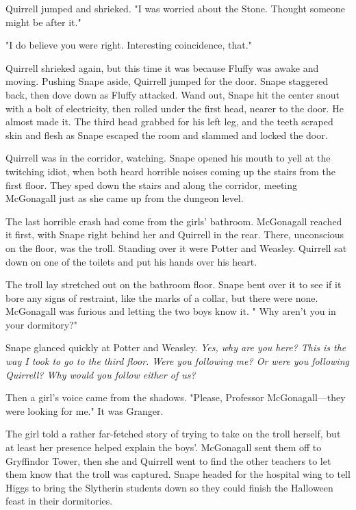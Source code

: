 Quirrell jumped and shrieked. "I{\el} was{\el} worried about the{\el} Stone. Thought{\el} someone might be{\el} after it."

"I do believe you were right. Interesting coincidence, that."

Quirrell shrieked again, but this time it was because Fluffy was awake and moving. Pushing Snape aside, Quirrell jumped for the door. Snape staggered back, then dove down as Fluffy attacked. Wand out, Snape hit the center snout with a bolt of electricity, then rolled under the first head, nearer to the door. He almost made it. The third head grabbed for his left leg, and the teeth scraped skin and flesh as Snape escaped the room and slammed and locked the door.

Quirrell was in the corridor, watching. Snape opened his mouth to yell at the twitching idiot, when both heard horrible noises coming up the stairs from the first floor. They sped down the stairs and along the corridor, meeting McGonagall just as she came up from the dungeon level.

The last horrible crash had come from the girls' bathroom. McGonagall reached it first, with Snape right behind her and Quirrell in the rear. There, unconscious on the floor, was the troll. Standing over it were Potter and Weasley. Quirrell sat down on one of the toilets and put his hands over his heart.

The troll lay stretched out on the bathroom floor. Snape bent over it to see if it bore any signs of restraint, like the marks of a collar, but there were none. McGonagall was furious and letting the two boys know it. "{\el} Why aren't you in your dormitory?"

Snape glanced quickly at Potter and Weasley. \emph{Yes, why are you here? This is the way I took to go to the third floor. Were you following me? Or were you following Quirrell? Why would you follow either of us?}

Then a girl's voice came from the shadows. "Please, Professor McGonagall—they were looking for me." It was Granger.

The girl told a rather far-fetched story of trying to take on the troll herself, but at least her presence helped explain the boys'. McGonagall sent them off to Gryffindor Tower, then she and Quirrell went to find the other teachers to let them know that the troll was captured. Snape headed for the hospital wing to tell Higgs to bring the Slytherin students down so they could finish the Halloween feast in their dormitories.

